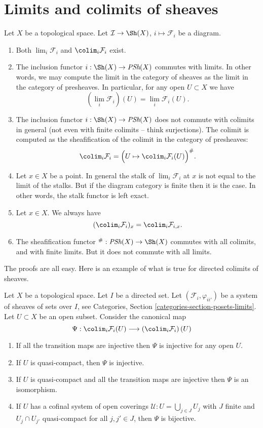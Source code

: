 \section{Limits and colimits of sheaves}
\label{section-limits-sheaves}

\noindent
Let $X$ be a topological space.
Let $\mathcal{I} \to \Sh(X)$, $i \mapsto \mathcal{F}_i$
be a diagram.
\begin{enumerate}
\item Both $\lim_i \mathcal{F}_i$ and $\colim_i \mathcal{F}_i$
exist.
\item The inclusion functor $i : \Sh(X) \to \textit{PSh}(X)$
commutes with limits. In other words, we may compute the limit
in the category of sheaves as the limit in the category of
presheaves. In particular, for any open $U \subset X$ we have
$$
(\lim_i \mathcal{F}_i)(U) = \lim_i \mathcal{F}_i(U).
$$
\item The inclusion functor $i : \Sh(X) \to \textit{PSh}(X)$
does not commute with colimits in general (not even
with finite colimits -- think surjections). The colimit is
computed as the sheafification of the colimit in the
category of presheaves:
$$
\colim_i \mathcal{F}_i =
\Big(U \mapsto \colim_i \mathcal{F}_i(U)\Big)^\#.
$$
\item Let $x \in X$ be a point. In general the stalk of
$\lim_i \mathcal{F}_i$ at $x$ is not equal to
the limit of the stalks. But if the diagram category is finite
then it is the case. In other words, the stalk functor is
left exact.
\item Let $x \in X$. We always have
$$
(\colim_i \mathcal{F}_i)_x = \colim_i \mathcal{F}_{i, x}.
$$
\item The sheafification functor
${}^\# : \textit{PSh}(X) \to \Sh(X)$ commutes with all
colimits, and with finite limits. But it does not commute
with all limits.
\end{enumerate}
The proofs are all easy. Here is an example of what is true for directed
colimits of sheaves.

\begin{lemma}
\label{lemma-directed-colimits-sections}
Let $X$ be a topological space. Let $I$ be a directed set.
Let $(\mathcal{F}_i, \varphi_{ii'})$ be a system of sheaves of sets
over $I$, see
Categories, Section \ref{categories-section-posets-limits}.
Let $U \subset X$ be an open subset.
Consider the canonical map
$$
\Psi :
\colim_i \mathcal{F}_i(U)
\longrightarrow
\left(\colim_i \mathcal{F}_i\right)(U)
$$
\begin{enumerate}
\item If all the transition maps are injective then
$\Psi$ is injective for any open $U$.
\item If $U$ is quasi-compact, then $\Psi$ is injective.
\item If $U$ is quasi-compact and all the transition maps are injective
then $\Psi$ is an isomorphism.
\item If $U$ has a cofinal system of open coverings
$\mathcal{U} : U = \bigcup_{j\in J} U_j$ with
$J$ finite and $U_j \cap U_{j'}$ quasi-compact
for all $j, j' \in J$, then $\Psi$ is bijective.
\end{enumerate}
\end{lemma}

